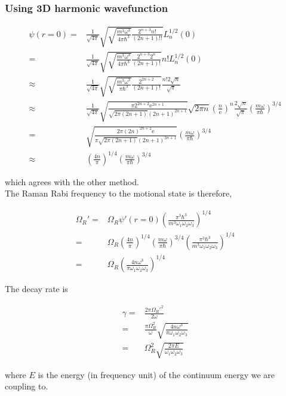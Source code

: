 \documentclass[10pt,fleqn]{article}
\newcommand{\ue}{\mathrm{e}}
\newcommand{\eqar}[1]
{
  \begin{align*}
    #1
  \end{align*}
}
\newcommand{\paren}[1]{{\left({#1}\right)}}
\begin{document}
\subsubsection{Using 3D harmonic wavefunction}
\eqar{
  \psi(r=0)=&\frac{1}{\sqrt{4\pi}}\sqrt{\sqrt{\frac{m^3\omega^3}{4\pi\hbar^3}}\frac{2^{n+3}n!}{(2n+1)!!}}L_n^{1/2}(0)\\
  =&\frac{1}{\sqrt{4\pi}}\sqrt{\sqrt{\frac{m^3\omega^3}{4\pi\hbar^3}}\frac{2^{n+3}2^n}{(2n+1)!}}n!L_n^{1/2}(0)\\
  \approx&\frac{1}{\sqrt{4\pi}}\sqrt{\sqrt{\frac{m^3\omega^3}{\pi\hbar^3}}\frac{2^{2n+2}}{(2n+1)!}}\frac{n! 2\sqrt{n}}{\sqrt{\pi}}\\
  \approx&\frac{1}{\sqrt{4\pi}}\sqrt{\frac{\pi 2^{2n+2}\ue^{2n+1}}{\sqrt{2\pi (2n+1)}(2n+1)^{2n+1}}}\sqrt{2\pi n}\paren{\frac{n}{\ue}}^n\frac{2\sqrt{n}}{\sqrt{\pi}}\paren{\frac{m\omega}{\pi\hbar}}^{3/4}\\
  =&\sqrt{\frac{2\pi (2n)^{2n+2}\ue}{\pi\sqrt{2\pi (2n+1)}(2n+1)^{2n+1}}}\paren{\frac{m\omega}{\pi\hbar}}^{3/4}\\
  \approx&\paren{\frac{4n}{\pi}}^{1/4}\paren{\frac{m\omega}{\pi\hbar}}^{3/4}
}
which agrees with the other method.\\

The Raman Rabi frequency to the motional state is therefore,
\eqar{
  \Omega_R'=&\Omega_R\psi'(r=0)\paren{\frac{\pi^3\hbar^3}{m^3\omega_1\omega_2\omega_3}}^{1/4}\\
  =&\Omega_R\paren{\frac{4n}{\pi}}^{1/4}\paren{\frac{m\omega}{\pi\hbar}}^{3/4}\paren{\frac{\pi^3\hbar^3}{m^3\omega_1\omega_2\omega_3}}^{1/4}\\
  =&\Omega_R\paren{\frac{4n\omega^3}{\pi\omega_1\omega_2\omega_3}}^{1/4}
}
The decay rate is
\eqar{
  \gamma=&\frac{2\pi\Omega_R'^2}{2\omega}\\
  =&\frac{\pi\Omega_R^2}{\omega}\sqrt{\frac{4n\omega^3}{\pi\omega_1\omega_2\omega_3}}\\
  =&\Omega_R^2\sqrt{\frac{2\pi E}{\omega_1\omega_2\omega_3}}
}
where $E$ is the energy (in frequency unit) of the continuum energy we are coupling to.
\end{document}
